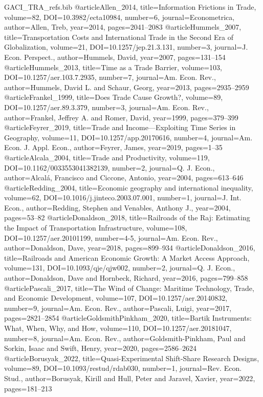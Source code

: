 \begin{filecontents*}[overwrite]{GACI_TRA_refs.bib}
@article{Allen_2014, title={Information Frictions in Trade}, volume={82}, DOI={10.3982/ecta10984}, number={6}, journal={Econometrica}, author={Allen, Treb}, year={2014}, pages={2041--2083} }
@article{Hummels_2007, title={Transportation Costs and International Trade in the Second Era of Globalization}, volume={21}, DOI={10.1257/jep.21.3.131}, number={3}, journal={J. Econ. Perspect.}, author={Hummels, David}, year={2007}, pages={131--154} }
@article{Hummels_2013, title={Time as a Trade Barrier}, volume={103}, DOI={10.1257/aer.103.7.2935}, number={7}, journal={Am. Econ. Rev.}, author={Hummels, David L. and Schaur, Georg}, year={2013}, pages={2935--2959} }
@article{Frankel_1999, title={Does Trade Cause Growth?}, volume={89}, DOI={10.1257/aer.89.3.379}, number={3}, journal={Am. Econ. Rev.}, author={Frankel, Jeffrey A. and Romer, David}, year={1999}, pages={379--399} }
@article{Feyrer_2019, title={Trade and Income---{Exploiting} Time Series in Geography}, volume={11}, DOI={10.1257/app.20170616}, number={4}, journal={Am. Econ. J. Appl. Econ.}, author={Feyrer, James}, year={2019}, pages={1--35} }
@article{Alcala_2004, title={Trade and Productivity}, volume={119}, DOI={10.1162/0033553041382139}, number={2}, journal={Q. J. Econ.}, author={Alcal\'a, Francisco and Ciccone, Antonio}, year={2004}, pages={613--646} }
@article{Redding_2004, title={Economic geography and international inequality}, volume={62}, DOI={10.1016/j.jinteco.2003.07.001}, number={1}, journal={J. Int. Econ.}, author={Redding, Stephen and Venables, Anthony J.}, year={2004}, pages={53--82} }
@article{Donaldson_2018, title={Railroads of the {Raj}: Estimating the Impact of Transportation Infrastructure}, volume={108}, DOI={10.1257/aer.20101199}, number={4-5}, journal={Am. Econ. Rev.}, author={Donaldson, Dave}, year={2018}, pages={899--934} }
@article{Donaldson_2016, title={Railroads and {American} Economic Growth: A Market Access Approach}, volume={131}, DOI={10.1093/qje/qjw002}, number={2}, journal={Q. J. Econ.}, author={Donaldson, Dave and Hornbeck, Richard}, year={2016}, pages={799--858} }
@article{Pascali_2017, title={The Wind of Change: Maritime Technology, Trade, and Economic Development}, volume={107}, DOI={10.1257/aer.20140832}, number={9}, journal={Am. Econ. Rev.}, author={Pascali, Luigi}, year={2017}, pages={2821--2854} }
@article{GoldsmithPinkham_2020, title={{Bartik} Instruments: What, When, Why, and How}, volume={110}, DOI={10.1257/aer.20181047}, number={8}, journal={Am. Econ. Rev.}, author={Goldsmith-Pinkham, Paul and Sorkin, Isaac and Swift, Henry}, year={2020}, pages={2586--2624} }
@article{Borusyak_2022, title={Quasi-Experimental Shift-Share Research Designs}, volume={89}, DOI={10.1093/restud/rdab030}, number={1}, journal={Rev. Econ. Stud.}, author={Borusyak, Kirill and Hull, Peter and Jaravel, Xavier}, year={2022}, pages={181--213} }

\end{filecontents*}
